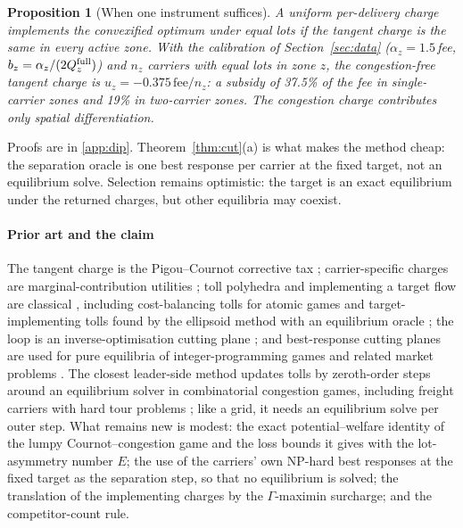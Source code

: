 \documentclass[preprint,12pt]{elsarticle}
\newtheorem{proposition}[theorem]{Proposition}
\theoremstyle{definition}
\theoremstyle{remark}
\begin{document}
\begin{proposition}[When one instrument suffices]\label{prop:uniform}
A uniform per-delivery charge implements the convexified optimum under equal lots if the tangent charge is the same in every active zone. With the calibration of Section~\ref{sec:data} ($\alpha_z=1.5\,$fee, $b_z=\alpha_z/(2Q^{\rm full}_z)$) and $n_z$ carriers with equal lots in zone $z$, the congestion-free tangent charge is $u_z=-0.375\,\mathrm{fee}/n_z$: a subsidy of 37.5\% of the fee in single-carrier zones and 19\% in two-carrier zones. The congestion charge contributes only spatial differentiation.
\end{proposition}

Proofs are in \ref{app:dip}. Theorem~\ref{thm:cut}(a) is what makes the method cheap: the separation oracle is one best response per carrier at the fixed target, not an equilibrium solve. Selection remains optimistic: the target is an exact equilibrium under the returned charges, but other equilibria may coexist.

\paragraph{Prior art and the claim} The tangent charge is the Pigou--Cournot corrective tax \citep{Buchanan1969,Barnett1980}; carrier-specific charges are marginal-contribution utilities \citep{Wolpert2001,Marden2013}; toll polyhedra and implementing a target flow are classical \citep{Bergendorff1997,Hearn1998}, including cost-balancing tolls for atomic games \citep{Fotakis2008} and target-implementing tolls found by the ellipsoid method with an equilibrium oracle \citep{Bhaskar2019}; the loop is an inverse-optimisation cutting plane \citep{Ahuja2001,Wang2009,Bodur2022}; and best-response cutting planes are used for pure equilibria of integer-programming games and related market problems \citep{Dragotto2023,Duguet2025}. The closest leader-side method updates tolls by zeroth-order steps around an equilibrium solver in combinatorial congestion games, including freight carriers with hard tour problems \citep{Masiha2026}; like a grid, it needs an equilibrium solve per outer step. What remains new is modest: the exact potential--welfare identity of the lumpy Cournot--congestion game and the loss bounds it gives with the lot-asymmetry number $E$; the use of the carriers' own NP-hard best responses at the fixed target as the separation step, so that no equilibrium is solved; the translation of the implementing charges by the $\Gamma$-maximin surcharge; and the competitor-count rule.
\end{document}
